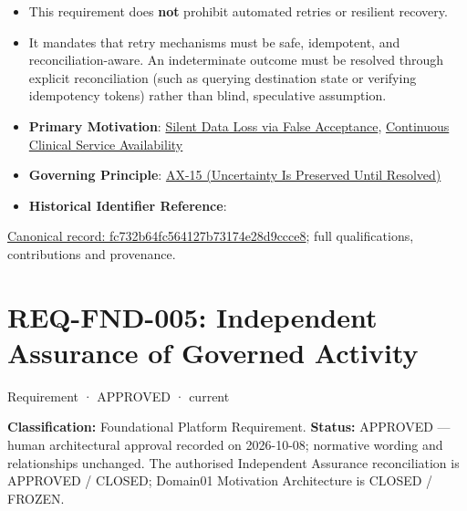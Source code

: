 \begin{itemize}


\item This requirement does \textbf{not} prohibit automated retries or resilient recovery.

\item 

It mandates that retry mechanisms must be safe, idempotent, and reconciliation-aware. An indeterminate outcome must be resolved through explicit reconciliation (such as querying destination state or verifying idempotency tokens) rather than blind, speculative assumption.




\item 

\textbf{Primary Motivation}: \href{\detokenize{../../../../../docs/markdown/01-motivation/drivers-assessments/assessments.md}}{Silent Data Loss via False Acceptance}, \href{\detokenize{../../../../../docs/markdown/01-motivation/drivers-assessments/drivers.md}}{Continuous Clinical Service Availability}




\item \textbf{Governing Principle}: \hyperref[element:ef8abbaec37e4890ad78b9f263e67906]{AX-15 (Uncertainty Is Preserved Until Resolved)}

\item \textbf{Historical Identifier Reference}: \texttt{}

\end{itemize}

{\footnotesize \href{../../../../continuum/motivation/requirement/fc732b64fc564127b73174e28d9ccce8.md}{Canonical record: fc732b64fc564127b73174e28d9ccce8}; full qualifications, contributions and provenance.}\par
\section{REQ-FND-005: Independent Assurance of Governed Activity}

\label{element:bbb7438e78604308abba93afc14f4e2e}
{\small Requirement · APPROVED · current}\par

\textbf{Classification:} Foundational Platform Requirement. \textbf{Status:} APPROVED — human architectural approval recorded on 2026-10-08; normative wording and relationships unchanged. The authorised Independent Assurance reconciliation is APPROVED / CLOSED; Domain01 Motivation Architecture is CLOSED / FROZEN.



